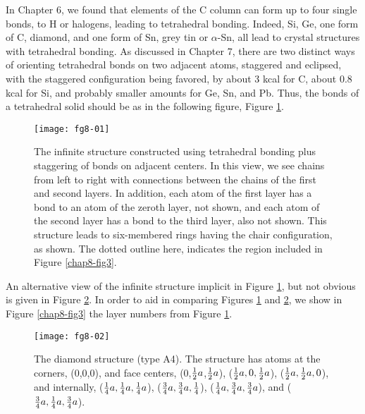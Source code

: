 In Chapter 6, we found that elements of the C column can form up to four 
single bonds, to H or halogens, leading to tetrahedral bonding. Indeed, 
Si, Ge, one form of C, diamond, and one form of Sn, grey tin or 
$\alpha$-Sn, all lead to crystal structures with tetrahedral bonding.
As discussed in Chapter 7, there are two distinct ways of orienting 
tetrahedral bonds on two adjacent atoms, staggered and eclipsed, with 
the staggered configuration being favored,
by about 3 kcal for C, about 0.8 kcal for Si, and probably smaller amounts 
for Ge, Sn, and Pb. Thus, the bonds of a tetrahedral solid should be as 
in the following figure, Figure \ref{chap8-fig1}.

\begin{figure}
\begin{center}
\texttt{[image: fg8-01]}
\end{center}
\caption{The infinite structure constructed using tetrahedral bonding 
plus staggering of bonds on adjacent centers. In this view, we see
chains from left to right with connections between the chains of the
first and second layers.  In addition, each atom of the first layer
has a bond to an atom of the zeroth layer, not shown, and each atom of
the second layer has a bond to the third layer, also not shown. This
structure leads to six-membered rings having the chair configuration,
as shown. The dotted outline here, indicates the region included in
Figure \ref{chap8-fig3}.}
\label{chap8-fig1}
\end{figure}

An alternative view of the infinite structure implicit in Figure
\ref{chap8-fig1}, but not obvious is given in Figure \ref{chap8-fig2}.
In order to aid in comparing Figures \ref{chap8-fig1} and
\ref{chap8-fig2}, we show in Figure \ref{chap8-fig3} the layer numbers
from Figure \ref{chap8-fig1}.


\begin{figure}
\begin{center}
\texttt{[image: fg8-02]}
\end{center}
\caption{The diamond structure (type A4). The structure has atoms at
the corners, (0,0,0), and face centers, (0,${1 \over 2}a$,${1 \over
2}a$), (${1 \over 2}a,0,{1 \over 2}a$), (${1 \over 2}a,{1 \over
2}a,0$), and internally, (${1 \over 4}a,{1 \over 4}a,{1 \over 4}a$),
(${3 \over 4}a,{3 \over 4}a,{1 \over 4}$), (${1 \over 4}a,{3 \over
4}a,{3 \over 4}a$), and (${3 \over 4}a,{1 \over 4}a,{3 \over 4}a$).}
\label{chap8-fig2}
\end{figure}

